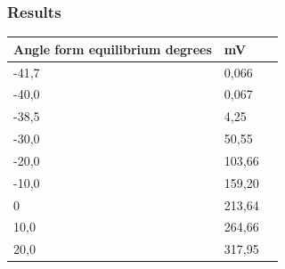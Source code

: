 \subsubsection{Results}
\begin{table}[H]
	\begin{tabular}{|l|l|p{4.3cm}|}
		\hline%
		\textbf{Angle form equilibrium degrees}       &  \textbf{mV}         \\
		\hline%
		-41,7                                         & 0,066               \\
		\hline%
		-40,0 										  & 0,067               \\
		\hline%
		-38,5                              			  & 4,25               \\
		\hline%
		-30,0                              			  & 50,55               \\
		\hline%
		-20,0                                         & 103,66               \\
		\hline%
		-10,0 										  & 159,20               \\
		\hline%
		0                               			  & 213,64               \\
		\hline%
		10,0                                          & 264,66               \\
		\hline%
		20,0 										  & 317,95               \\
		\hline%

\end{tabular}
\end{table}
